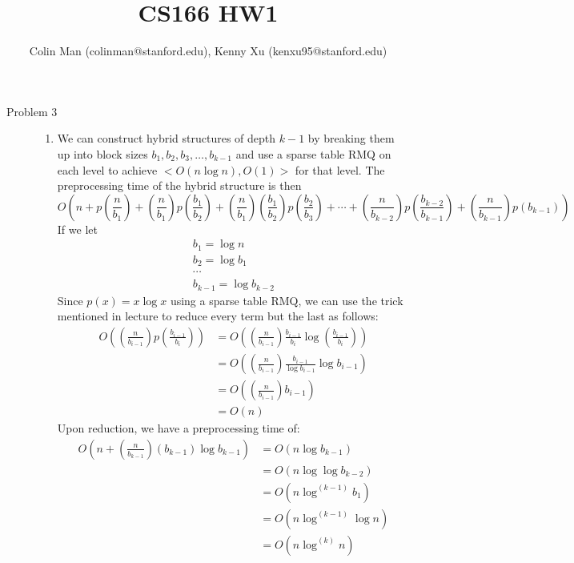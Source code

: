\documentclass[11pt,oneside,a4paper]{article}
\begin{document}
\title{CS166 HW1}
\author{Colin Man (colinman@stanford.edu), Kenny Xu (kenxu95@stanford.edu)}

\maketitle

\begin{description}

\item[Problem 3]\noindent 

\begin{enumerate}[label=\roman*]
\item We can construct hybrid structures of depth $k-1$ by breaking them up into block sizes $b_1, b_2, b_3, \ldots, b_{k-1}$ and use a sparse table RMQ on each level to achieve $<O(n\log n),O(1)>$ for that level. The preprocessing time of the hybrid structure is then \[
    O(n + p(\frac{n}{b_1}) + (\frac{n}{b_1}) p(\frac{b_1}{b_2}) + (\frac{n}{b_1})(\frac{b_1}{b_2}) p(\frac{b_2}{b_3}) + \cdots + (\frac{n}{b_{k-2}}) p(\frac{b_{k-2}}{b_{k-1}}) + (\frac{n}{b_{k-1}}) p(b_{k-1}))
\] If we let \begin{align*}
               b_1=\log n \\
               b_2=\log b_1 \\
               \cdots \\
               b_{k-1} = \log b_{k-2}
             \end{align*}
Since $p(x)=x\log x$ using a sparse table RMQ, we can use the trick mentioned in lecture to reduce every term but the last as follows: \begin{align*}
  O((\frac{n}{b_{i-1}})p(\frac{b_{i-1}}{b_i})) &= O((\frac{n}{b_{i-1}})\frac{b_{i-1}}{b_i}\log(\frac{b_{i-1}}{b_i})) \\ &= O((\frac{n}{b_{i-1}})\frac{b_{i-1}}{\log b_{i-1}}\log b_{i-1}) \\ &= O((\frac{n}{b_{i-1}})b_{i-1}) \\ &= O(n)
\end{align*}
Upon reduction, we have a preprocessing time of: \begin{align*}
                           O(n + (\frac{n}{b_{k-1}}) (b_{k-1})\log b_{k-1}) &= O(n\log b_{k-1}) \\ &= O(n\log \log b_{k-2}) \\ &= O(n\log^{(k-1)} b_1) \\ &= O(n\log^{(k-1)} \log n) \\ &= O(n\log^{(k)} n)
                         \end{align*}


\end{enumerate}
\end{description}
\end{document}
